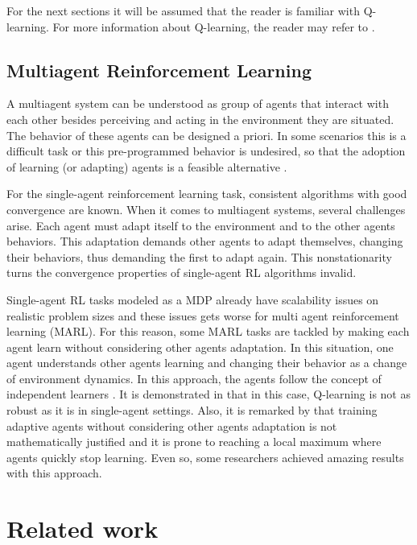 \documentclass[12pt]{llncs}
\begin{document}
For the next sections it will be assumed that the reader is familiar with Q-learning. For more information about Q-learning, the reader may refer to \cite{Watkins&Dayan1992}.

\subsection{Multiagent Reinforcement Learning}
A multiagent system can be understood as group of agents that interact with each other besides perceiving and acting in the environment they are situated. The behavior of these agents can be designed a priori. In some scenarios this is a difficult task or this pre-programmed behavior is undesired, so that the adoption of learning (or adapting) agents is a feasible alternative \cite{Busoniu+2008}.

For the single-agent reinforcement learning task, consistent algorithms with good convergence are known. When it comes to multiagent systems, several challenges arise. Each agent must adapt itself to the environment and to the other agents behaviors. This adaptation demands other agents to adapt themselves, changing their behaviors, thus demanding the first to adapt again. This nonstationarity turns the convergence properties of single-agent RL algorithms invalid.

Single-agent RL tasks modeled as a MDP already have scalability issues on realistic problem sizes and these issues gets worse for multi agent reinforcement learning (MARL). For this reason, some MARL tasks are tackled by making each agent learn without considering other agents adaptation. In this situation, one agent understands other agents learning and changing their behavior as a change of environment dynamics. In this approach, the agents follow the concept of independent learners \cite{Claus&Boutilier1998}. It is demonstrated in \cite{Claus&Boutilier1998} that in this case, Q-learning is not as robust as it is in single-agent settings. Also, it is remarked by \cite{Littman1994} that training adaptive agents without considering other agents adaptation is not mathematically justified and it is prone to reaching a local maximum where agents quickly stop learning. Even so, some researchers achieved amazing results with this approach.

\section{Related work}
\label{sec:related}
\end{document}
